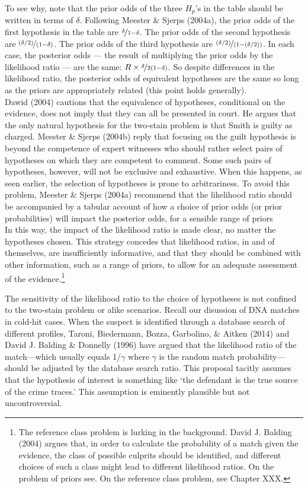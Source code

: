 \documentclass[
  10pt,
  dvipsnames,enabledeprecatedfontcommands]{scrartcl}
\begin{document}
To see why, note that the prior odds of the three \(H_p\)'s in the table
should be written in terms of \(\delta\). Following Meester \& Sjerps
(2004a), the prior odds of the first hypothesis in the table are
\(\nicefrac{\delta}{1-\delta}\). The prior odds of the second hypothesis
are \(\nicefrac{(\delta/2)}{(1-\delta)}\). The prior odds of the third
hypothesis are \(\nicefrac{(\delta/2)}{(1-(\delta/2))}\). In each case,
the posterior odds --- the result of multiplying the prior odds by the
likelihood ratio --- are the same:
\(R\times \nicefrac{\delta}{2(1-\delta)}\). So despite differences in
the likelihood ratio, the posterior odds of equivalent hypotheses are
the same so long as the priors are appropriately related (this point
holds generally).\\
Dawid (2004) cautions that the equivalence of hypotheses, conditional on
the evidence, does not imply that they can all be presented in court. He
argues that the only natural hypothesis for the two-stain problem is
that Smith is guilty as charged. Meester \& Sjerps (2004b) reply that
focusing on the guilt hypothesis is beyond the competence of expert
witnesses who should rather select pairs of hypotheses on which they are
competent to comment. Some such pairs of hypotheses, however, will not
be exclusive and exhaustive. When this happens, as seen earlier, the
selection of hypotheses is prone to arbitrariness. To avoid this
problem, Meester \& Sjerps (2004a) recommend that the likelihood ratio
should be accompanied by a tabular account of how a choice of prior odds
(or prior probabilities) will impact the posterior odds, for a sensible
range of priors\\
 In this
way, the impact of the likelihood ratio is made clear, no matter the
hypotheses chosen. This strategy concedes that likelihood ratios, in and
of themselves, are insufficiently informative, and that they should be
combined with other information, such as a range of priors, to allow for
an adequate assessment of the evidence.\footnote{The reference class
  problem is lurking in the background. David J. Balding (2004) argues
  that, in order to calculate the probability of a match given the
  evidence, the class of possible culprits should be identified, and
  different choices of such a class might lead to different likelihood
  ratios. On the problem of priors see. On the reference class problem,
  see Chapter XXX.}

The sensitivity of the likelihood ratio to the choice of hypotheses is
not confined to the two-stain problem or alike scenarios. Recall our
disussion of DNA matches in cold-hit cases. When the suspect is
identified through a database search of different profiles, Taroni,
Biedermann, Bozza, Garbolino, \& Aitken (2014) and David J. Balding \&
Donnelly (1996) have argued that the likelihood ratio of the
match---which usually equals 1/\(\gamma\) where \(\gamma\) is the random
match probability---should be adjusted by the database search ratio.
This proposal tacitly assumes that the hypothesis of interest is
something like `the defendant is the true source of the crime traces.'
This assumption is eminently plausible but not uncontroversial.
\end{document}
